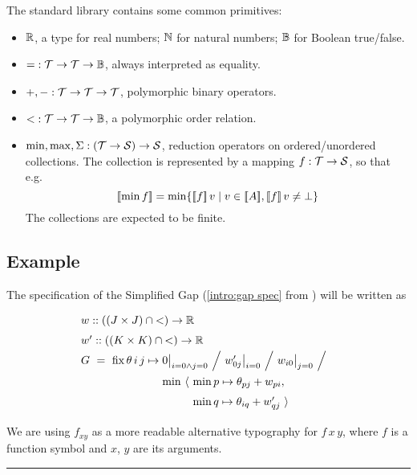 The standard library contains some common primitives:

\begin{itemize}
  \item $\mathbb{R}$, a type for real numbers; $\mathbb{N}$ for natural numbers; $\mathbb{B}$ for Boolean true/false.
  \item ${=} : \mathcal{T}\to\mathcal{T}\to\mathbb{B}$, always interpreted as equality.
  \item ${+}, {-} : \mathcal{T}\to\mathcal{T}\to\mathcal{T}$, polymorphic binary operators.
  \item ${<} : \mathcal{T}\to\mathcal{T}\to\mathbb{B}$, a polymorphic order relation.
  \item $\min, \max, \Sigma : (\mathcal{T}\to\mathcal{S})\to\mathcal{S}$, reduction operators
    on ordered/unordered collections. The collection is represented by a mapping $f : \mathcal{T}\to\mathcal{S}$,
    so that e.g. \[\semp{\min f} = \min \{\semp{f}\,v \;|\; v\in\semp{A}, \semp{f}\,v\neq\bot\}\]
    The collections are expected to be finite.
\end{itemize}

\subsection{Example \hrulefill}

The specification of the Simplified Gap (\eqref{intro:gap spec} from ) will be written as
%
\begin{equation}
  \renewcommand\arraystretch{1.5}
  \begin{array}{@{}l@{}l@{}l@{}}
    \lspan3{w :: ((J\times J)\cap{<})\to\R} \\
    \lspan3{w' :: ((K\times K)\cap{<})\to\R} \\
    G ~=~ \fix \theta\,i\,j\mapsto{}
      & \lspan2{0\big|_{i=0\land j=0} ~\Big/~ w'_{0j}\big|_{i=0} ~\Big/~ w_{i0}\big|_{j=0} ~\Big/~} \\
      & \min~\langle~ & \min p\mapsto\theta_{pj}+w_{pi}, \\
      & & \min q\mapsto\theta_{iq}+w'_{qj} ~\rangle
  \end{array}
  \label{lang:gap spec}
\end{equation}

\medskip
We are using $f_{xy}$
as a more readable alternative typography for $f\,x\,y$,
where $f$ is a function symbol and $x$, $y$ are its arguments.

\medskip
\hrule
